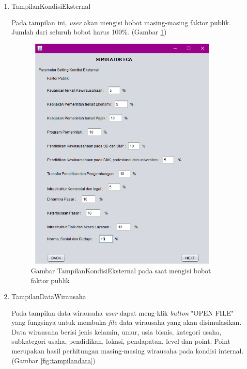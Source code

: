 \begin{enumerate}
	\item TampilanKondisiEksternal
	
	Pada tampilan ini, \textit{user} akan mengisi bobot masing-masing faktor publik. Jumlah dari seluruh bobot harus 100\%. (Gambar \ref{fig:tampilaneksternal1})
	
		\begin{figure} [H]
	\centering  
	\includegraphics[width=10cm, height=12cm]{tampilanImplementasiEksternal} 
		\caption[Gambar TampilanKetetanggaan]{Gambar TampilanKondisiEksternal pada saat mengisi bobot faktor publik}
	\label{fig:tampilaneksternal1} 
\end{figure}

	\item TampilanDataWirausaha
	
 	Pada tampilan data wirausaha \textit{user} dapat meng-klik \textit{button} "OPEN FILE" yang fungsinya untuk membuka \textit{file} data wirausaha yang akan disimulasikan. Data wirausaha berisi jenis kelamin, umur, usia bisnis, kategori usaha, subkategori usaha, pendidikan, lokasi, pendapatan, level dan point. Point merupakan hasil perhitungan masing-masing wirausaha pada kondisi internal. (Gambar \ref{fig:tampilandata})
	

\end{enumerate}
